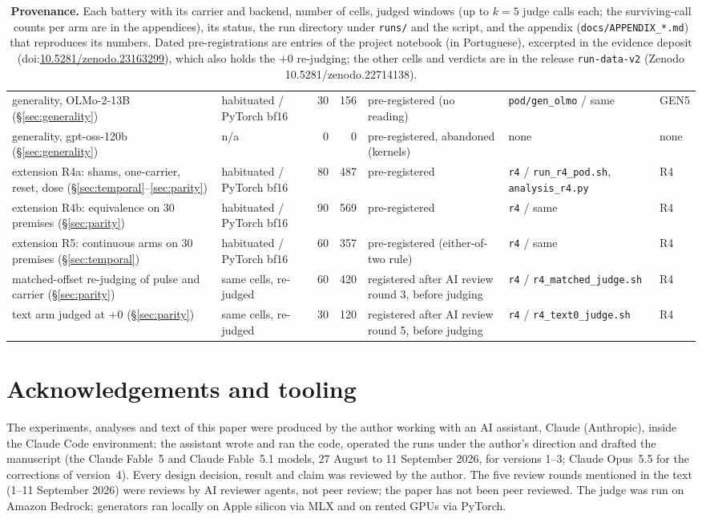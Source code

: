 \documentclass[11pt]{article}
\newcommand{\evidencedoi}{10.5281/zenodo.23163299}
\begin{document}
\begin{table}[h]
{\begin{tabular}{llrrlll}
generality, OLMo-2-13B (\S\ref{sec:generality}) & habituated / PyTorch bf16 & 30 & 156 & pre-registered (no reading) & \texttt{pod/gen\_olmo} / same & GEN5 \\
generality, gpt-oss-120b (\S\ref{sec:generality}) & n/a & 0 & 0 & pre-registered, abandoned (kernels) & none & none \\
extension R4a: shams, one-carrier, reset, dose (\S\ref{sec:temporal}--\ref{sec:parity}) & habituated / PyTorch bf16 & 80 & 487 & pre-registered & \texttt{r4} / \texttt{run\_r4\_pod.sh}, \texttt{analysis\_r4.py} & R4 \\
extension R4b: equivalence on 30 premises (\S\ref{sec:parity}) & habituated / PyTorch bf16 & 90 & 569 & pre-registered & \texttt{r4} / same & R4 \\
extension R5: continuous arms on 30 premises (\S\ref{sec:temporal}) & habituated / PyTorch bf16 & 60 & 357 & pre-registered (either-of-two rule) & \texttt{r4} / same & R4 \\
matched-offset re-judging of pulse and carrier (\S\ref{sec:parity}) & same cells, re-judged & 60 & 420 & registered after AI review round 3, before judging & \texttt{r4} / \texttt{r4\_matched\_judge.sh} & R4 \\
text arm judged at $+0$ (\S\ref{sec:parity}) & same cells, re-judged & 30 & 120 & registered after AI review round 5, before judging & \texttt{r4} / \texttt{r4\_text0\_judge.sh} & R4 \\
\bottomrule
\end{tabular}}
\caption{\textbf{Provenance.} Each battery with its carrier and
backend, number of cells, judged windows (up to $k{=}5$ judge calls
each; the surviving-call counts per arm are in the appendices), its
status, the run directory under \texttt{runs/} and the script, and the
appendix (\texttt{docs/APPENDIX\_*.md}) that reproduces its numbers.
Dated pre-registrations are entries of the project notebook (in
Portuguese), excerpted in the evidence deposit
(doi:\href{https://doi.org/\evidencedoi}{\evidencedoi}), which also holds
the $+0$ re-judging; the other cells and verdicts are in the release
\texttt{run-data-v2} (Zenodo 10.5281/zenodo.22714138).}
\label{tab:prov}
\end{table}

\section*{Acknowledgements and tooling}
The experiments, analyses and text of this paper were produced by the
author working with an AI assistant, Claude (Anthropic), inside the
Claude Code environment: the assistant wrote and ran the code, operated
the runs under the author's direction and drafted the manuscript (the
Claude Fable~5 and Claude Fable~5.1 models, 27 August to 11 September
2026, for versions 1--3; Claude Opus~5.5 for the corrections of
version~4). Every design decision, result and claim was reviewed by the
author. The five review rounds mentioned in the text (1--11 September
2026) were reviews by AI reviewer agents, not peer review; the paper
has not been peer reviewed. The judge was run on Amazon Bedrock;
generators ran locally on Apple silicon via MLX and on rented GPUs via
PyTorch.
\end{document}
